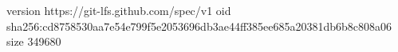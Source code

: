 version https://git-lfs.github.com/spec/v1
oid sha256:cd8758530aa7e54e799f5e2053696db3ae44ff385ee685a20381db6b8c808a06
size 349680
